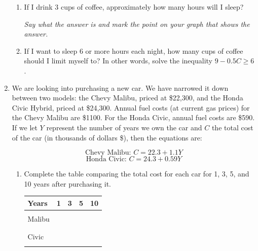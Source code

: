 \documentclass[12pt]{article}
\begin{document}
\begin{enumerate}
\begin{enumerate}
\item If I drink 3 cups of coffee, approximately how many hours will I sleep?

\emph{Say what the answer is and mark the point on your graph that shows the answer.}
\vfill
\item If I want to sleep 6 or more hours each night, how many cups of coffee should I limit myself to?  In other words, solve the inequality $9-0.5C \ge 6$.
\vfill
\vfill
\vfill
\end{enumerate}

\newpage
\item We are looking into purchasing a new car.  We have narrowed it down between two models: the Chevy Malibu, priced at \$22,300, and the Honda Civic Hybrid, priced at \$24,300.  Annual fuel costs (at current gas prices) for the Chevy Malibu are \$1100.  For the Honda Civic, annual fuel costs are \$590.   If we let $Y$ represent the number of years we own the car and $C$ the total cost of the car (in thousands of dollars \$), then the equations are:

$$\text{Chevy Malibu:  }C = 22.3 + 1.1Y$$
$$\text{Honda Civic:  }C = 24.3 + 0.59Y$$

\begin{enumerate}
\item Complete the table comparing the total cost for each car for 1, 3, 5, and 10 years after purchasing it.


\begin{center}
\begin{tabular} {|l |c |c |c |c |} \hline
Years &\hspace{.25in} 1\hspace{.25in} & \hspace{.25in}3\hspace{.25in} & \hspace{.25in}5\hspace{.25in} &\hspace{.25in}10\hspace{.25in} \\ \hline
&&&& \\ 
Malibu &&&& \\ 
&&&& \\ \hline
&&&& \\ 
Civic &&&& \\  
&&&& \\ \hline
\end{tabular}
\end{center}




\end{enumerate}
\end{enumerate}
\end{document}
